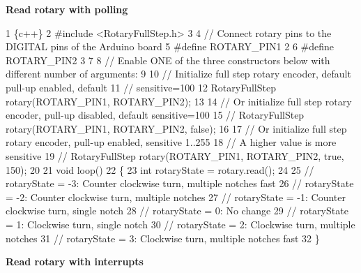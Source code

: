 {\bfseries Read rotary with polling} 
\begin{DoxyCode}
1 \{c++\}
2 #include <RotaryFullStep.h>
3 
4 // Connect rotary pins to the DIGITAL pins of the Arduino board
5 #define ROTARY\_PIN1   2
6 #define ROTARY\_PIN2   3
7 
8 // Enable ONE of the three constructors below with different number of arguments:
9 
10 // Initialize full step rotary encoder, default pull-up enabled, default 
11 // sensitive=100
12 RotaryFullStep rotary(ROTARY\_PIN1, ROTARY\_PIN2);
13 
14 // Or initialize full step rotary encoder, pull-up disabled, default sensitive=100
15 // RotaryFullStep rotary(ROTARY\_PIN1, ROTARY\_PIN2, false);
16 
17 // Or initialize full step rotary encoder, pull-up enabled, sensitive 1..255
18 // A higher value is more sensitive
19 // RotaryFullStep rotary(ROTARY\_PIN1, ROTARY\_PIN2, true, 150);
20 
21 void loop()
22 \{
23   int rotaryState = rotary.read();
24 
25   // rotaryState = -3: Counter clockwise turn, multiple notches fast
26   // rotaryState = -2: Counter clockwise turn, multiple notches
27   // rotaryState = -1: Counter clockwise turn, single notch
28   // rotaryState = 0:  No change
29   // rotaryState = 1:  Clockwise turn, single notch
30   // rotaryState = 2:  Clockwise turn, multiple notches
31   // rotaryState = 3:  Clockwise turn, multiple notches fast
32 \}
\end{DoxyCode}


{\bfseries Read rotary with interrupts}


